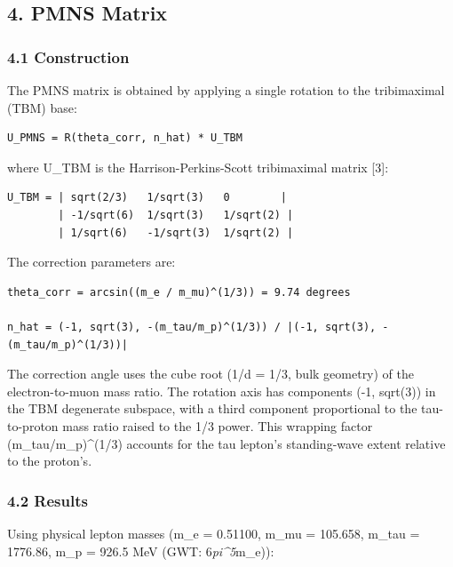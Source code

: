 \documentclass[
]{article}
\begin{document}
\subsection{4. PMNS Matrix}\label{pmns-matrix}

\subsubsection{4.1 Construction}\label{construction-1}

The PMNS matrix is obtained by applying a single rotation to the
tribimaximal (TBM) base:

\begin{verbatim}
U_PMNS = R(theta_corr, n_hat) * U_TBM
\end{verbatim}

where U\_TBM is the Harrison-Perkins-Scott tribimaximal matrix {[}3{]}:

\begin{verbatim}
U_TBM = | sqrt(2/3)   1/sqrt(3)   0        |
        | -1/sqrt(6)  1/sqrt(3)   1/sqrt(2) |
        | 1/sqrt(6)   -1/sqrt(3)  1/sqrt(2) |
\end{verbatim}

The correction parameters are:

\begin{verbatim}
theta_corr = arcsin((m_e / m_mu)^(1/3)) = 9.74 degrees

n_hat = (-1, sqrt(3), -(m_tau/m_p)^(1/3)) / |(-1, sqrt(3), -(m_tau/m_p)^(1/3))|
\end{verbatim}

The correction angle uses the cube root (1/d = 1/3, bulk geometry) of
the electron-to-muon mass ratio. The rotation axis has components (-1,
sqrt(3)) in the TBM degenerate subspace, with a third component
proportional to the tau-to-proton mass ratio raised to the 1/3 power.
This wrapping factor (m\_tau/m\_p)\^{}(1/3) accounts for the tau
lepton's standing-wave extent relative to the proton's.

\subsubsection{4.2 Results}\label{results-1}

Using physical lepton masses (m\_e = 0.51100, m\_mu = 105.658, m\_tau =
1776.86, m\_p = 926.5 MeV (GWT: 6\emph{pi\^{}5}m\_e)):
\end{document}
